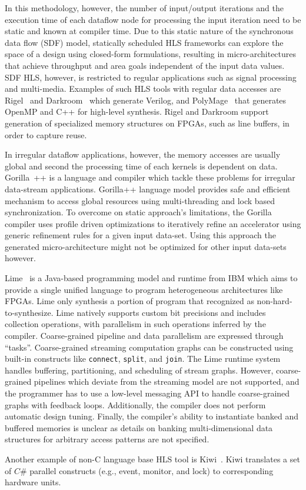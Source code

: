 In this methodology, however, the number of input/output iterations and the execution time of each dataflow node for processing the input iteration need to be static and known at compiler time.
Due to this static nature of the synchronous data flow (SDF) model, statically scheduled HLS frameworks can explore the space of a design using closed-form formulations, resulting in micro-architectures that achieve throughput and area goals independent of the input data values.
SDF HLS, however, is restricted to regular applications such as signal processing and multi-media.
Examples of such HLS tools with regular data accesses are Rigel~\cite{hegarty_2016_rigel} and Darkroom~\cite{darkroom} which generate Verilog, and PolyMage~\cite{mullapudi_asplos_2015_polymage} that generates OpenMP and C++ for high-level synthesis.
Rigel and Darkroom support generation of specialized memory structures on FPGAs, such as line buffers, in order to capture reuse.

In irregular dataflow applications, however, the memory accesses are usually global and second the processing time of each kernels is dependent on data. 
Gorilla~\cite{lavasani_thesis}++ is a language and compiler which tackle these problems for irregular  data-stream applications.
Gorilla++ language model provides safe and efficient mechanism to access global resources using multi-threading and lock based synchronization.
To overcome on static approach's limitations, the Gorilla compiler uses profile driven optimizations to iteratively refine an accelerator using generic refinement rules for a given input data-set.
Using this approach the generated micro-architecture might not be optimized for other input data-sets however.

Lime~\cite{lime} is a Java-based programming model and runtime from IBM which aims to provide a single unified language to program heterogeneous architectures like FPGAs.
Lime only synthesis a portion of program that recognized as non-hard-to-synthesize.
Lime natively supports custom bit precisions and includes collection operations, with parallelism in such operations inferred by the compiler.
Coarse-grained pipeline and data parallelism are expressed through ``tasks''.
Coarse-grained streaming computation graphs can be constructed using built-in constructs like \texttt{\small{connect}}, \texttt{\small{split}}, and \texttt{\small{join}}.
The Lime runtime system handles buffering, partitioning, and scheduling of stream graphs.
However, coarse-grained pipelines which deviate from the streaming model are not supported, and the programmer has to use a low-level messaging API to handle coarse-grained graphs with feedback loops.
Additionally, the compiler does not perform automatic design tuning.
Finally, the compiler's ability to instantiate banked and buffered memories is unclear as details on banking multi-dimensional data structures for arbitrary access patterns are not specified.

Another example of non-C language base HLS tool is Kiwi~\cite{kiwi}.
Kiwi translates a set of $C\#$ parallel constructs (e.g., event, monitor, and lock) to corresponding hardware units.